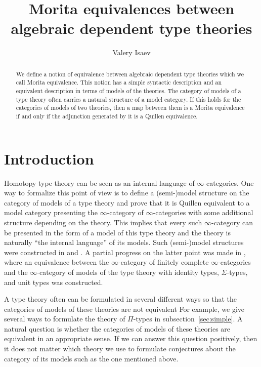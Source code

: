 \documentclass[reqno]{amsart}
\theoremstyle{definition}
\theoremstyle{remark}
\numberwithin{figure}{section}
\begin{document}
\title{Morita equivalences between algebraic dependent type theories}

\author{Valery Isaev}

\begin{abstract}
We define a notion of equivalence between algebraic dependent type theories which we call Morita equivalence.
This notion has a simple syntactic description and an equivalent description in terms of models of the theories.
The category of models of a type theory often carries a natural structure of a model category.
If this holds for the categories of models of two theories, then a map between them is a Morita equivalence if and only if the adjunction generated by it is a Quillen equivalence.
\end{abstract}

\maketitle

\section{Introduction}

Homotopy type theory can be seen as an internal language of $\infty$-categories.
One way to formalize this point of view is to define a (semi-)model structure on the category of models of a type theory and
prove that it is Quillen equivalent to a model category presenting the $\infty$-category of $\infty$-categories with some additional structure depending on the theory.
This implies that every such $\infty$-category can be presented in the form of a model of this type theory and the theory is naturally ``the internal language'' of its models.
Such (semi-)model structures were constructed in \cite{alg-models} and \cite{kap-lum-model}.
A partial progress on the latter point was made in \cite{kapulkin-szumilo-fin-comp},
where an equivalence between the $\infty$-category of finitely complete $\infty$-categories and the $\infty$-category of models of the type theory with identity types, $\Sigma$-types, and unit types was constructed.

A type theory often can be formulated in several different ways so that the categories of models of these theories are not equivalent
For example, we give several ways to formulate the theory of $\Pi$-types in subsection~\ref{sec:simple}.
A natural question is whether the categories of models of these theories are equivalent in an appropriate sense.
If we can answer this question positively, then it does not matter which theory we use to formulate conjectures about the category of its models such as the one mentioned above.
\end{document}
